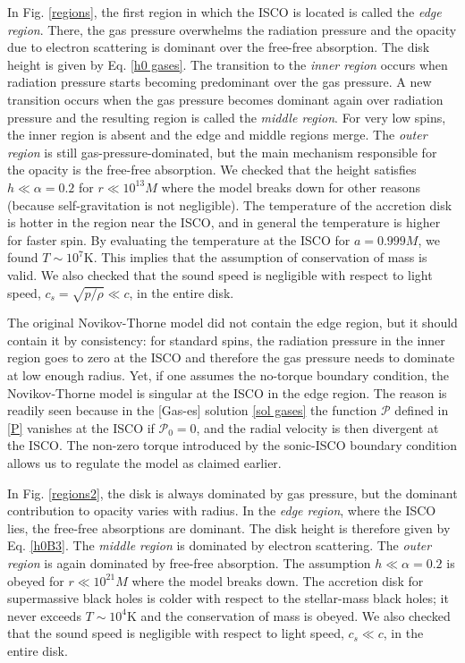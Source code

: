 \documentclass[a4paper,fleqn,usenatbib]{mnrasMOD}
\numberwithin{equation}{section}
\begin{document}
In Fig. \ref{regions}, the first region in which the ISCO is located is called the \emph{edge region}. There, the gas pressure overwhelms the radiation pressure and the opacity due to electron scattering is dominant over the free-free absorption. The disk height is given by Eq. \eqref{h0 gases}. The transition to the \emph{inner region} occurs when radiation pressure starts becoming predominant over the gas pressure. A new transition occurs when the gas pressure becomes dominant again over radiation pressure and the resulting region is called the \emph{middle region}. For very low spins, the inner region is absent and the edge and middle regions merge.  The \emph{outer region} is still gas-pressure-dominated, but the main mechanism responsible for the opacity is the free-free absorption.  We checked that the height satisfies $h \ll \alpha = 0.2$ for $r \ll 10^{13}M$ where the model breaks down for other reasons (because self-gravitation is not negligible). The temperature of the accretion disk is hotter in the region near the ISCO, and in general the temperature is higher for faster spin. By evaluating the temperature at the ISCO for $a=0.999M$, we found $T \sim 10^7 $K. This implies that the assumption of conservation of  mass is valid. We also checked that the sound speed is negligible with respect to light speed, $c_s =\sqrt{p/\rho}\ll c$, in the entire disk. 

The original Novikov-Thorne model did not contain the edge region, but it should contain it by consistency: for standard spins, the radiation pressure in the inner region goes to zero at the ISCO and therefore the gas pressure needs to dominate at low enough radius. Yet, if one assumes the no-torque boundary condition, the Novikov-Thorne model is singular at the ISCO in the edge region. The reason is readily seen because in the [Gas-es] solution  \eqref{sol gases} the function $\mathcal{P}$ defined in \eqref{P} vanishes at the ISCO if $\mathcal P_0=0$, and the radial velocity is then divergent at the ISCO. The non-zero torque introduced by the sonic-ISCO boundary condition allows us to regulate the model as claimed earlier. 


In Fig. \ref{regions2}, the disk is always dominated by gas pressure, but the dominant contribution to opacity varies with radius. In the \emph{edge region}, where the ISCO lies, the free-free absorptions are dominant. The disk height is therefore given by Eq. \eqref{h0B3}. The \emph{middle region} is dominated by electron scattering. The \emph{outer region} is again dominated by free-free absorption. The assumption $h \ll \alpha = 0.2$ is obeyed for $r \ll 10^{21} M$ where the model breaks down. The accretion disk for supermassive black holes is colder with respect to the stellar-mass black holes; it never exceeds $T \sim 10^4$K and the conservation of mass is obeyed. We also checked that the sound speed is negligible with respect to light speed, $c_s \ll c$, in the entire disk. 
\end{document}
